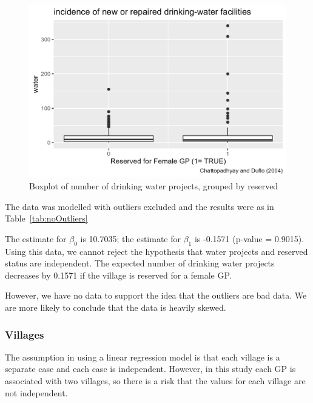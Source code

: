 \documentclass[12pt,letterpaper]{article}
\begin{document}
  \begin{figure}[htb!]
	\caption{\footnotesize{Boxplot of number of drinking water projects, grouped by reserved}}
	\vspace{.5cm}
	\centering
	\label{fig:reserved_water_boxplot}
	\includegraphics[width=1.0\textwidth]{graphics/resrvd_water_boxplot.png}
  \end{figure}		
	
  

  The data was modelled with outliers excluded and the results were as in 
  Table~\ref{tab:noOutliers}
  
  The estimate for $\beta_0$ is 10.7035; the estimate for $\beta_1$ is -0.1571
  (p-value = 0.9015).  Using this data, we cannot reject the hypothesis that 
  water projects and reserved status are independent.  The expected number of 
  drinking water projects decreases by 0.1571 if the village is reserved for a 
  female GP.
  
  However, we have no data to support the idea that the outliers are bad data.  
  We are more likely to conclude that the data is heavily skewed.

  
  
  \subsubsection*{Villages}
  
  The assumption in using a linear regression model is that each village is a 
  separate case and each case is independent.  However, in this study 
  each GP is associated with two villages, so there is a risk that the values for 
  each village are not independent.
  
\end{document}
